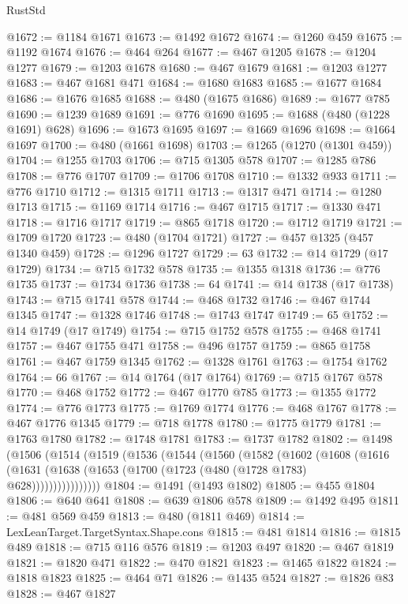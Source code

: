 \begin{lexlean}{RustStd}
\begin{coremodule}
{\begin{coremodule}
{{{{{{{{{{{{{{{{{{{{{{{{{{{{{{{{{@1672 := @1184 @1671
@1673 := @1492 @1672
@1674 := @1260 @459
@1675 := @1192 @1674
@1676 := @464 @264
@1677 := @467 @1205
@1678 := @1204 @1277
@1679 := @1203 @1678
@1680 := @467 @1679
@1681 := @1203 @1277
@1683 := @467 @1681 @471
@1684 := @1680 @1683
@1685 := @1677 @1684
@1686 := @1676 @1685
@1688 := @480 (@1675 @1686)
@1689 := @1677 @785
@1690 := @1239 @1689
@1691 := @776 @1690
@1695 := @1688 (@480 (@1228 @1691) @628)
@1696 := @1673 @1695
@1697 := @1669 @1696
@1698 := @1664 @1697
@1700 := @480 (@1661 @1698)
@1703 := @1265 (@1270 (@1301 @459))
@1704 := @1255 @1703
@1706 := @715 @1305 @578
@1707 := @1285 @786
@1708 := @776 @1707
@1709 := @1706 @1708
@1710 := @1332 @933
@1711 := @776 @1710
@1712 := @1315 @1711
@1713 := @1317 @471
@1714 := @1280 @1713
@1715 := @1169 @1714
@1716 := @467 @1715
@1717 := @1330 @471
@1718 := @1716 @1717
@1719 := @865 @1718
@1720 := @1712 @1719
@1721 := @1709 @1720
@1723 := @480 (@1704 @1721)
@1727 := @457 @1325 (@457 @1340 @459)
@1728 := @1296 @1727
@1729 := 63
@1732 := @14 @1729 (@17 @1729)
@1734 := @715 @1732 @578
@1735 := @1355 @1318
@1736 := @776 @1735
@1737 := @1734 @1736
@1738 := 64
@1741 := @14 @1738 (@17 @1738)
@1743 := @715 @1741 @578
@1744 := @468 @1732
@1746 := @467 @1744 @1345
@1747 := @1328 @1746
@1748 := @1743 @1747
@1749 := 65
@1752 := @14 @1749 (@17 @1749)
@1754 := @715 @1752 @578
@1755 := @468 @1741
@1757 := @467 @1755 @471
@1758 := @496 @1757
@1759 := @865 @1758
@1761 := @467 @1759 @1345
@1762 := @1328 @1761
@1763 := @1754 @1762
@1764 := 66
@1767 := @14 @1764 (@17 @1764)
@1769 := @715 @1767 @578
@1770 := @468 @1752
@1772 := @467 @1770 @785
@1773 := @1355 @1772
@1774 := @776 @1773
@1775 := @1769 @1774
@1776 := @468 @1767
@1778 := @467 @1776 @1345
@1779 := @718 @1778
@1780 := @1775 @1779
@1781 := @1763 @1780
@1782 := @1748 @1781
@1783 := @1737 @1782
@1802 := @1498
    (@1506
      (@1514
        (@1519
          (@1536
            (@1544
              (@1560
                (@1582
                  (@1602
                    (@1608
                      (@1616
                        (@1631 (@1638 (@1653 (@1700 (@1723 (@480 (@1728 @1783) @628))))))))))))))))
@1804 := @1491 (@1493 @1802)
@1805 := @455 @1804
@1806 := @640 @641
@1808 := @639 @1806 @578
@1809 := @1492 @495
@1811 := @481 @569 @459
@1813 := @480 (@1811 @469)
@1814 := LexLeanTarget.TargetSyntax.Shape.cons
@1815 := @481 @1814
@1816 := @1815 @489
@1818 := @715 @116 @576
@1819 := @1203 @497
@1820 := @467 @1819
@1821 := @1820 @471
@1822 := @470 @1821
@1823 := @1465 @1822
@1824 := @1818 @1823
@1825 := @464 @71
@1826 := @1435 @524
@1827 := @1826 @83
@1828 := @467 @1827
}}}}}}}}}}}}}}}}}}}}}}}}}}}}}}}}}
\end{coremodule}}
\end{coremodule}
\end{lexlean}
